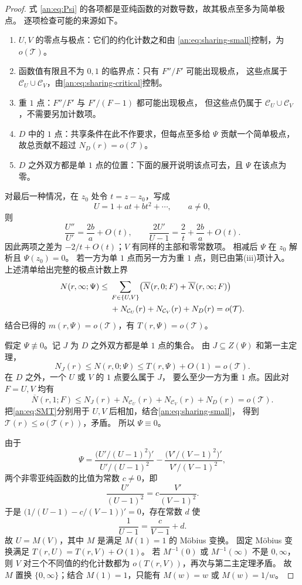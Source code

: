 \documentclass[11pt,a4paper,oneside,openany]{book}
\theoremstyle{lecture}
\newcommand{\bN}{\overline N}
\newcommand{\TT}{\mathcal T}
\numberwithin{equation}{section}
\begin{document}
\begin{proof}
式 \eqref{an:eq:Psi} 的各项都是亚纯函数的对数导数，故其极点至多为简单极点。
逐项检查可能的来源如下。
\begin{enumerate}[label=(\roman*)]
\item $U,V$ 的零点与极点：它们的约化计数之和由
\eqref{an:eq:sharing-small}控制，为 $o(\TT)$。
\item 函数值有限且不为 $0,1$ 的临界点：只有 $F''/F'$ 可能出现极点，
这些点属于 $\mathcal C_U\cup\mathcal C_V$，由\eqref{an:eq:sharing-critical}控制。
\item 重 $1$ 点：$F''/F'$ 与 $F'/(F-1)$ 都可能出现极点，
但这些点仍属于 $\mathcal C_U\cup\mathcal C_V$，不需要另加计数项。
\item $D$ 中的 $1$ 点：共享条件在此不作要求，但每点至多给 $\Psi$
贡献一个简单极点，故总贡献不超过 $N_D(r)=o(\TT)$。
\item $D$ 之外双方都是单 $1$ 点的位置：下面的展开说明该点可去，且 $\Psi$ 在该点为零。
\end{enumerate}
对最后一种情况，在 $z_0$ 处令 $t=z-z_0$，写成
\[
 U=1+at+bt^2+\cdots,\qquad a\ne0,
\]
则
\[
 \frac{U''}{U'}=\frac{2b}{a}+O(t),\qquad
 \frac{2U'}{U-1}=\frac2t+\frac{2b}{a}+O(t).
\]
因此两项之差为 $-2/t+O(t)$；$V$ 有同样的主部和零常数项。
相减后 $\Psi$ 在 $z_0$ 解析且 $\Psi(z_0)=0$。
若一方为单 $1$ 点而另一方为重 $1$ 点，则已由第(iii)项计入。
上述清单给出完整的极点计数上界
\begin{align}\label{an:eq:sharing-polecount}
 N(r,\infty;\Psi)\le{}&
 \sum_{F\in\{U,V\}}\bigl(\bN(r,0;F)+\bN(r,\infty;F)\bigr)\notag\\
 &+N_{\mathcal C_U}(r)+N_{\mathcal C_V}(r)+N_D(r)=o(\TT).
\end{align}
结合已得的 $m(r,\Psi)=o(\TT)$，有 $T(r,\Psi)=o(\TT)$。

假定 $\Psi\not\equiv0$。记 $J$ 为 $D$ 之外双方都是单 $1$ 点的集合。
由 $J\subseteq Z(\Psi)$ 和第一主定理，
\[
 N_J(r)\le N(r,0;\Psi)\le T(r,\Psi)+O(1)=o(\TT).
\]
在 $D$ 之外，一个 $U$ 或 $V$ 的 $1$ 点要么属于 $J$，
要么至少一方为重 $1$ 点。因此对 $F=U,V$ 均有
\[
 \bN(r,1;F)\le N_J(r)+N_{\mathcal C_U}(r)+N_{\mathcal C_V}(r)+N_D(r)
 =o(\TT).
\]
把\eqref{an:eq:SMT}分别用于 $U,V$ 后相加，结合\eqref{an:eq:sharing-small}，
得到 $\TT(r)\le o(\TT(r))$，矛盾。
所以 $\Psi\equiv0$。

由于
\[
 \Psi=\frac{\bigl(U'/(U-1)^2\bigr)'}{U'/(U-1)^2}
       -\frac{\bigl(V'/(V-1)^2\bigr)'}{V'/(V-1)^2},
\]
两个非零亚纯函数的比值为常数 $c\ne0$，即
\[
 \frac{U'}{(U-1)^2}=c\frac{V'}{(V-1)^2}.
\]
于是 $\bigl(1/(U-1)-c/(V-1)\bigr)'=0$，存在常数 $d$ 使
\[
 \frac1{U-1}=\frac c{V-1}+d.
\]
故 $U=M(V)$，其中 $M$ 是满足 $M(1)=1$ 的 Möbius 变换。
固定 Möbius 变换满足 $T(r,U)=T(r,V)+O(1)$。
若 $M^{-1}(0)$ 或 $M^{-1}(\infty)$ 不是 $0,\infty$，
则 $V$ 对三个不同值的约化计数都为 $o(T(r,V))$，再次与第二主定理矛盾。
故 $M$ 置换 $\{0,\infty\}$；结合 $M(1)=1$，只能有 $M(w)=w$ 或 $M(w)=1/w$。
\end{proof}
\end{document}
